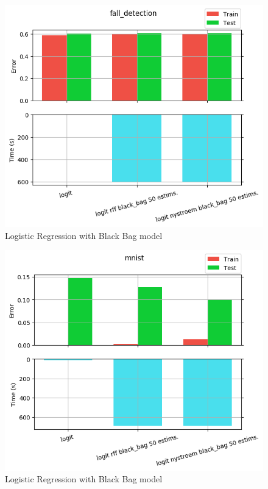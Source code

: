 \begin{figure}[th]
\centering
\includegraphics[scale=\imgscale]{Figures/2_2/fall_detection}
\decoRule
\caption[2.2 fall\tu detection]{Logistic Regression with Black Bag model}
\label{fig:2_2_fall_detection}
\end{figure}

\begin{figure}[th]
\centering
\includegraphics[scale=\imgscale]{Figures/2_2/mnist}
\decoRule
\caption[2.2 mnist]{Logistic Regression with Black Bag model}
\label{fig:2_2_mnist}
\end{figure}

